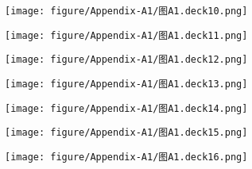 \begin{figure}[htbp]
\small
    \centering
    \texttt{[image: figure/Appendix-A1/图A1.deck10.png]}
    \caption{}
    \label{图A1.deck10}
\end{figure}

\begin{figure}[htbp]
\small
    \centering
    \texttt{[image: figure/Appendix-A1/图A1.deck11.png]}
    \caption{}
    \label{图A1.deck11}
\end{figure}

\begin{figure}[htbp]
\small
    \centering
    \texttt{[image: figure/Appendix-A1/图A1.deck12.png]}
    \caption{}
    \label{图A1.deck12}
\end{figure}

\begin{figure}[htbp]
\small
    \centering
    \texttt{[image: figure/Appendix-A1/图A1.deck13.png]}
    \caption{}
    \label{图A1.deck13}
\end{figure}

\begin{figure}[htbp]
\small
    \centering
    \texttt{[image: figure/Appendix-A1/图A1.deck14.png]}
    \caption{}
    \label{图A1.deck14}
\end{figure}

\begin{figure}[htbp]
\small
    \centering
    \texttt{[image: figure/Appendix-A1/图A1.deck15.png]}
    \caption{}
    \label{图A1.deck15}
\end{figure}

\begin{figure}[htbp]
\small
    \centering
    \texttt{[image: figure/Appendix-A1/图A1.deck16.png]}
    \caption{}
    \label{图A1.deck16}
\end{figure}